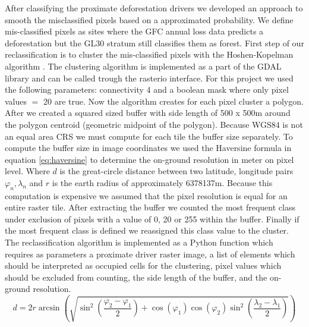 			After classifying the proximate deforestation drivers we developed an approach to smooth the misclassified pixels based on a approximated probability. We define mis-classified pixels as sites where the \ac{GFC} annual loss data predicts a deforestation but the \ac{GL30} stratum still classifies them as forest. First step of our reclassification is to cluster the mis-classified pixels with the Hoshen-Kopelman algorithm \citep{Hoshen1998}. The clustering algorithm is implemented as a part of the \ac{GDAL} library and can be called trough the rasterio interface. For this project we used the following parameters: connectivity 4 and a boolean mask where only pixel values $=$ 20 are true. Now the algorithm creates for each pixel cluster a polygon. After we created a squared sized buffer with side length of 500 x 500m around the polygon centroid (geometric midpoint of the polygon). Because \ac{WGS84} is not an equal area \ac{CRS} we must compute for each tile the buffer size separately. To compute the buffer size in image coordinates we used the Haversine formula in equation \ref{eq:haversine} to determine the on-ground resolution in meter on pixel level. Where $d$ is the great-circle distance between two latitude, longitude pairs $\varphi_n, \lambda_n$ and $r$ is the earth radius of approximately 6378137m. Because this computation is expensive we assumed that the pixel resolution is equal for an entire raster tile. After extracting the buffer we counted the most frequent class under exclusion of pixels with a value of 0, 20 or 255 within the buffer. Finally if the most frequent class is defined we reassigned this class value to the cluster. The reclassification algorithm is implemented as a Python function which requires as parameters a proximate driver raster image, a list of elements which should be interpreted as occupied cells for the clustering, pixel values which should be excluded from counting, the side length of the buffer, and the on-ground resolution. 
			\begin{equation}
			\label{eq:haversine}
				d = 2r\arcsin\left(
				\sqrt{
						\sin^2\left(\frac{\varphi_2-\varphi_1}{2}\right)+\cos\left(\varphi_1\right)\cos\left(\varphi_2\right)\sin^2\left(\frac{\lambda_2-\lambda_1}{2}\right)
				}
				\right)
			\end{equation}

